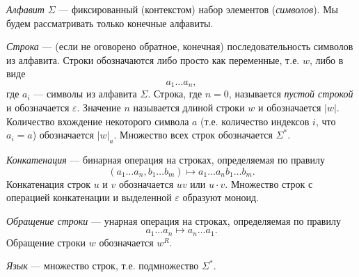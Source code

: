 \documentclass[12pt,a4paper]{article}
\begin{document}
    \begin{definition}
        \emph{Алфавит} $\Sigma$ --- фиксированный (контекстом) набор элементов (\emph{символов}). Мы будем рассматривать только конечные алфавиты.
        
        \emph{Строка} --- (если не оговорено обратное, конечная) последовательность символов из алфавита. Строки обозначаются либо просто как переменные, т.е. $w$, либо в виде
        \[a_1 \dots a_n,\]
        где $a_i$ --- символы из алфавита $\Sigma$. Строка, где $n=0$, называется \emph{пустой строкой} и обозначается $\varepsilon$. Значение $n$ называется длиной строки $w$ и обозначается $|w|$. Количество вхождение некоторого символа $a$ (т.е. количество индексов $i$, что $a_i = a$) обозначается $|w|_a$. Множество всех строк обозначается $\Sigma^*$.
        
        \emph{Конкатенация} --- бинарная операция на строках, определяемая по правилу
        \[(a_1 \dots a_n, b_1 \dots b_m) \mapsto a_1 \dots a_n b_1 \dots b_m.\]
        Конкатенация строк $u$ и $v$ обозначается $uv$ или $u \cdot v$. Множество строк с операцией конкатенации и выделенной $\varepsilon$ образуют моноид.

        \emph{Обращение строки} --- унарная операция на строках, определяемая по правилу
        \[a_1 \dots a_n \mapsto a_n \dots a_1.\]
        Обращение строки $w$ обозначается $w^R$.

        \emph{Язык} --- множество строк, т.е. подмножество $\Sigma^*$.
    \end{definition}
\end{document}
